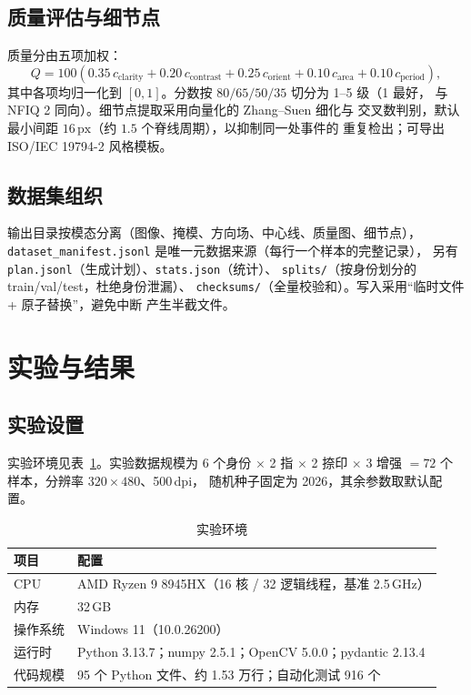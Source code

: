 \documentclass[UTF8, fontset=windows, a4paper, 11pt]{ctexart}
\newcommand{\px}{\,\mathrm{px}}
\newcommand{\tabref}[1]{表~\ref{#1}}
\begin{document}
\subsection{质量评估与细节点}

质量分由五项加权：
\begin{equation}
Q = 100\left(0.35\,c_{\text{clarity}} + 0.20\,c_{\text{contrast}}
        + 0.25\,c_{\text{orient}} + 0.10\,c_{\text{area}}
        + 0.10\,c_{\text{period}}\right),
\end{equation}
其中各项均归一化到 $[0,1]$。分数按 $80/65/50/35$ 切分为 1--5 级（1 最好，
与 NFIQ 2 同向）。细节点提取采用向量化的 Zhang--Suen 细化\cite{zhang1984}与
交叉数判别，默认最小间距 $16\px$（约 $1.5$ 个脊线周期），以抑制同一处事件的
重复检出；可导出 ISO/IEC 19794-2 风格模板\cite{iso19794}。

\subsection{数据集组织}

输出目录按模态分离（图像、掩模、方向场、中心线、质量图、细节点），
\texttt{dataset\_manifest.jsonl} 是唯一元数据来源（每行一个样本的完整记录），
另有 \texttt{plan.jsonl}（生成计划）、\texttt{stats.json}（统计）、
\texttt{splits/}（按身份划分的 train/val/test，杜绝身份泄漏）、
\texttt{checksums/}（全量校验和）。写入采用``临时文件 + 原子替换''，避免中断
产生半截文件。

\section{实验与结果}

\subsection{实验设置}

实验环境见\tabref{tab:env}。实验数据规模为 6 个身份 $\times$ 2 指 $\times$
2 捺印 $\times$ 3 增强 $= 72$ 个样本，分辨率 $320\times480$、500\,dpi，
随机种子固定为 2026，其余参数取默认配置。

\begin{table}[H]
\centering
\caption{实验环境}
\label{tab:env}
\small
\begin{tabular}{ll}
\toprule
项目 & 配置 \\
\midrule
CPU & AMD Ryzen 9 8945HX（16 核 / 32 逻辑线程，基准 2.5\,GHz） \\
内存 & 32\,GB \\
操作系统 & Windows 11（10.0.26200） \\
运行时 & Python 3.13.7；numpy 2.5.1；OpenCV 5.0.0；pydantic 2.13.4 \\
代码规模 & 95 个 Python 文件、约 1.53 万行；自动化测试 916 个 \\
\bottomrule
\end{tabular}
\end{table}
\end{document}
